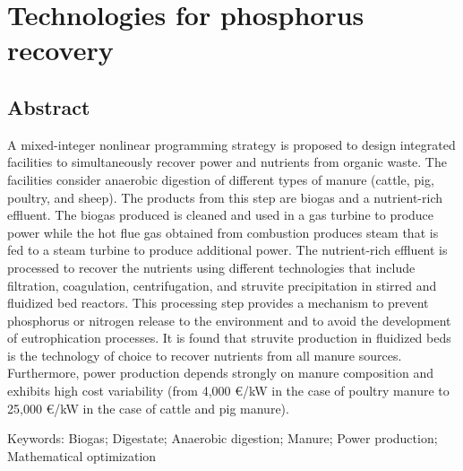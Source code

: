 \chapter{Technologies for phosphorus recovery}\label{ch:PhosphorusTechs}
\begin{refsection}[referencesCh2]
\section*{Abstract}
A mixed-integer nonlinear programming strategy is proposed to design integrated facilities to simultaneously recover power and nutrients from organic waste. The facilities consider anaerobic digestion of different types of manure (cattle, pig, poultry, and sheep). The products from this step are biogas and a nutrient-rich effluent. The biogas produced is cleaned and used in a gas turbine to produce power while the hot flue gas obtained from combustion produces steam that is fed to a steam turbine to produce additional power. The nutrient-rich effluent is processed to recover the nutrients using different technologies that include filtration, coagulation, centrifugation, and struvite precipitation in stirred and fluidized bed reactors. This processing step provides a mechanism to prevent phosphorus or nitrogen release to the environment and to avoid the development of eutrophication processes. It is found that struvite production in fluidized beds is the technology of choice to recover nutrients from all manure sources. Furthermore, power production depends strongly on manure composition and exhibits high cost variability (from 4,000 €/kW in the case of poultry manure to 25,000 €/kW in the case of cattle and pig manure).

\bigskip
Keywords: Biogas; Digestate; Anaerobic digestion; Manure; Power production; Mathematical optimization

\newpage


\end{refsection}

